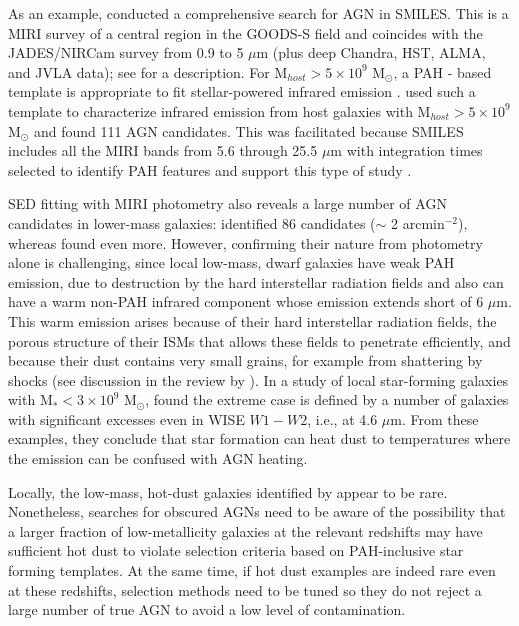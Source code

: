 \documentclass[twocolumn]{aastex63}
\begin{document}
As an example, \citet{Lyu2024} conducted a comprehensive search for AGN in SMILES. This is a MIRI survey of a central region in the GOODS-S field and coincides with the JADES/NIRCam survey from 0.9 to 5 $\mu$m (plus deep Chandra, HST, ALMA, and JVLA data); see \citet{Rieke2024} for a description. 
For M$_{host} > 5 \times 10^9$ M$_\odot$, a PAH - based template is appropriate to fit stellar-powered infrared emission \citep{Shivaei2024}. \citet{Lyu2024} used such a  template to characterize  infrared emission from host galaxies with M$_{host} > 5 \times 10^9$ M$_\odot$ and found 111 AGN candidates. This was facilitated because SMILES includes all the MIRI bands from 5.6 through 25.5 $\mu$m with integration times  selected to identify PAH features and support this type of study \citep{Rieke2024}.


SED fitting with MIRI photometry also reveals a large number of AGN candidates in lower-mass galaxies: \citet{Lyu2024} identified 86 candidates ($\sim$ 2 arcmin$^{-2}$), whereas \citet{Yang2023} found even more.  However, confirming their nature from photometry alone is challenging, since local low-mass, dwarf galaxies have weak PAH emission,  due to destruction by the hard interstellar radiation fields \citep[e.g.,][]{Hunt2010} and also can have a warm non-PAH infrared component \citep[e.g.,][]{Wu2006, Remy2015} whose emission extends short of 6 $\mu$m. This warm emission arises because of their hard interstellar radiation fields, the porous structure of their ISMs \citep{Madden2016} that allows these fields to penetrate efficiently, and because their  dust contains very small grains, for example from shattering by shocks (see discussion in the review by \citet{Hunter2024}). 
In a study of local star-forming galaxies with M$_* < 3 \times 10^9$ M$_\odot$, \citet{Hainline2016} found the extreme case is defined by a  number of galaxies with significant excesses even in WISE $W1-W2$, i.e., at 4.6 $\mu$m. From these examples, they conclude that star formation can heat dust to temperatures where the emission can be confused with AGN heating. 

Locally, the low-mass, hot-dust galaxies identified by \citet{Hainline2016} appear to be rare. Nonetheless, searches for obscured AGNs need to be aware of the possibility that a larger fraction of low-metallicity galaxies at the relevant redshifts may have sufficient hot dust to violate selection criteria based on PAH-inclusive star forming templates. At the same time, if hot dust examples are indeed rare even at these  redshifts, selection methods need to be tuned so they do not reject a large number of true AGN to avoid a low level of contamination.  
\end{document}
